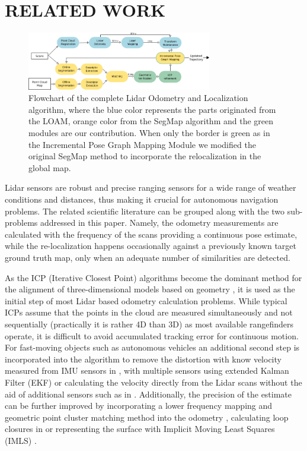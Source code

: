 \documentclass[letterpaper, 10 pt, conference]{ieeeconf}  %
\begin{document}
\section{RELATED WORK} \label{related}

\begin{figure}[!h]
\centerline{\includegraphics[width=0.72\textwidth]{figures/lol_flowchart_5.png}}\par
\caption{Flowchart of the complete Lidar Odometry and Localization algorithm, where the blue color represents the parts originated from the LOAM, orange color from the SegMap algorithm and the green modules are our contribution. When only the border is green as in the Incremental Pose Graph Mapping Module we modified the original SegMap method to incorporate the relocalization in the global map.}
\label{fig:loam-segmap_flowchart}
\end{figure}

Lidar sensors are robust and precise ranging sensors for a wide range of weather conditions and distances, thus making it crucial for autonomous navigation problems. 
The related scientific literature can be grouped along with the two sub-problems addressed in this paper. Namely, the odometry measurements are calculated with the frequency of the scans providing a continuous pose estimate, while the re-localization happens occasionally against a previously known target ground truth map, only when an adequate number of similarities are detected.

As the ICP (Iterative Closest Point) algorithms become the dominant method for the alignment of three-dimensional models based on geometry \cite{essential_icp}, it is used as the initial step of most Lidar based odometry calculation problems. While typical ICPs assume that the points in the cloud are measured simultaneously and not sequentially (practically it is rather 4D than 3D) as most available rangefinders operate, it is difficult to avoid accumulated tracking error for continuous motion. For fast-moving objects such as autonomous vehicles an additional second step is incorporated into the algorithm to remove the distortion with know velocity measured from IMU sensors in \cite{imu_icp}, with multiple sensors using extended Kalman Filter (EKF) \cite{ekf_icp} or calculating the velocity directly from the Lidar scans without the aid of additional sensors such as in \cite{vicp}. Additionally, the precision of the estimate can be further improved by incorporating a lower frequency mapping and geometric point cluster matching method into the odometry \cite{zlot}, calculating loop closures in \cite{bosse} or representing the surface with Implicit Moving Least Squares (IMLS) \cite{imls_icp}. 
\end{document}
